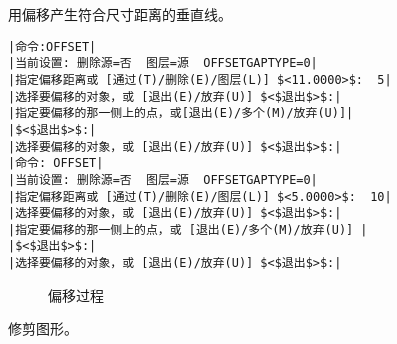 \begin{procedure}
\item 用偏移产生符合尺寸距离的垂直线。
\begin{lstlisting}
|命令:OFFSET|
|当前设置: 删除源=否  图层=源  OFFSETGAPTYPE=0|
|指定偏移距离或 [通过(T)/删除(E)/图层(L)] $<11.0000>$:  5|
|选择要偏移的对象，或 [退出(E)/放弃(U)] $<$退出$>$:|
|指定要偏移的那一侧上的点，或[退出(E)/多个(M)/放弃(U)]|
|$<$退出$>$:|
|选择要偏移的对象，或 [退出(E)/放弃(U)] $<$退出$>$:|
|命令: OFFSET|
|当前设置: 删除源=否  图层=源  OFFSETGAPTYPE=0|
|指定偏移距离或 [通过(T)/删除(E)/图层(L)] $<5.0000>$:  10|
|选择要偏移的对象，或 [退出(E)/放弃(U)] $<$退出$>$:|
|指定要偏移的那一侧上的点，或 [退出(E)/多个(M)/放弃(U)] |
|$<$退出$>$:|
|选择要偏移的对象，或 [退出(E)/放弃(U)] $<$退出$>$:|
\end{lstlisting}
\begin{figure}[htbp]
\hspace{20pt}
\hspace{20pt}
\caption{偏移过程}
\end{figure}
\item 修剪图形。


\end{procedure}

